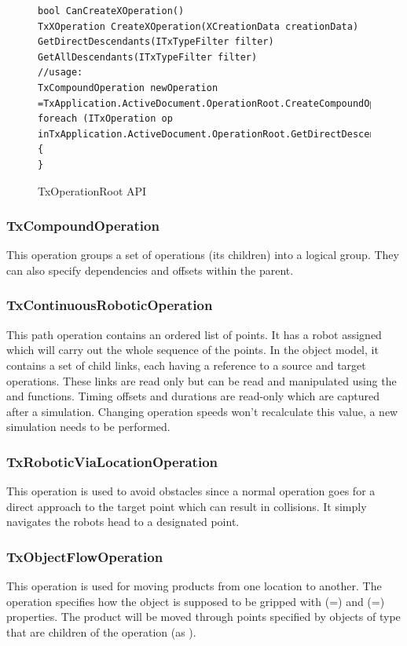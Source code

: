 \begin{figure}[H]
    \caption{TxOperationRoot API}
    \centering
    \begin{verbatim}
bool CanCreateXOperation()
TxXOperation CreateXOperation(XCreationData creationData)
GetDirectDescendants(ITxTypeFilter filter)
GetAllDescendants(ITxTypeFilter filter)
//usage:
TxCompoundOperation newOperation =TxApplication.ActiveDocument.OperationRoot.CreateCompoundOperation(newTxCompoundOperationCreationData("name"));
foreach (ITxOperation op inTxApplication.ActiveDocument.OperationRoot.GetDirectDescendants(newTxNoTypeFilter()))
{
}
    \end{verbatim}
    \label{fig:CodeTxOperationRoot}
\end{figure}


\subsubsection{TxCompoundOperation}

This operation groups a set of operations (its children) into a logical group. They can also specify dependencies and offsets within the parent.

\subsubsection{TxContinuousRoboticOperation}

This path operation contains an ordered list of points.
It has a robot assigned which will carry out the whole sequence of the points.
In the object model, it contains a set of child links, each having a reference to a source and target operations.
These links are read only but can be read and manipulated using the  and  functions.
Timing offsets and durations are read-only which are captured after a simulation. Changing operation speeds won't recalculate this value, a new simulation needs to be performed. 

\subsubsection{TxRoboticViaLocationOperation}

This operation is used to avoid obstacles since a normal operation goes for a direct approach to the target point which can result in collisions.
It simply navigates the robots head to a designated point.

\subsubsection{TxObjectFlowOperation}

This operation is used for moving products from one location to another.
The operation specifies how the object is supposed to be gripped with  (=) and  (=) properties.
The product will be moved through points specified by objects of type  that are children of the operation (as ).
